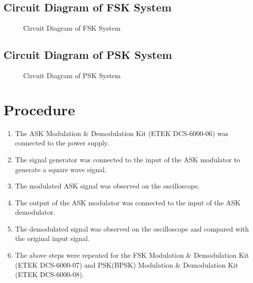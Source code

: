\documentclass[12pt]{article}
\begin{document}
\subsection*{Circuit Diagram of FSK System}
\begin{figure}[H]
    \centering
    \caption{Circuit Diagram of FSK System}
    \label{fig:fsk}
\end{figure}

\subsection*{Circuit Diagram of PSK System}
\begin{figure}[H]
    \centering
    \caption{Circuit Diagram of PSK System}
    \label{fig:psk}
\end{figure}

\section*{Procedure}
\begin{enumerate}
    \item The ASK Modulation \& Demodulation Kit (ETEK DCS-6000-06) was connected to the power supply.
    \item The signal generator was connected to the input of the ASK modulator to generate a square wave signal.
    \item The modulated ASK signal was observed on the oscilloscope.
    \item The output of the ASK modulator was connected to the input of the ASK demodulator.
    \item The demodulated signal was observed on the oscilloscope and compared with the original input signal.
    \item The above steps were repeated for the FSK Modulation \& Demodulation Kit (ETEK DCS-6000-07) and PSK(BPSK) Modulation \& Demodulation Kit (ETEK DCS-6000-08).
\end{enumerate}

\end{document}
